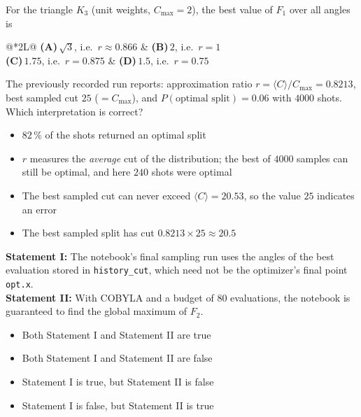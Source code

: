 \documentclass[11pt,a4paper]{article}
\newcommand{\optlabel}[1]{\textbf{(#1)}}
\newenvironment{qitem}[1]{\begin{list}{}{\setlength{\leftmargin}{3.3em}\setlength{\labelwidth}{3.1em}%
  \setlength{\labelsep}{0.2em}\setlength{\topsep}{3pt}\setlength{\parsep}{3pt}}\item[\textbf{Q.#1}\hfill]}{\end{list}}
\newcommand{\qsep}{\par\vspace{2pt}{\color{black!15}\hrule}\vspace{4pt}}
\begin{document}
\begin{qitem}{56}
For the triangle $K_3$ (unit weights, $C_{\max} = 2$), the best value of $F_1$ over all angles is
\par\smallskip\noindent\begin{tabularx}{\linewidth}{@{}*{2}{L}@{}}
\optlabel{A}\,$\sqrt3$, i.e.\ $r \approx 0.866$ & \optlabel{B}\,$2$, i.e.\ $r = 1$ \\[3pt]
\optlabel{C}\,$1.75$, i.e.\ $r = 0.875$ & \optlabel{D}\,$1.5$, i.e.\ $r = 0.75$
\end{tabularx}
\end{qitem}
\qsep

\begin{qitem}{57}
The previously recorded run reports: approximation ratio $r = \langle C\rangle/C_{\max} = 0.8213$, best sampled cut $25$
($= C_{\max}$), and $P(\text{optimal split}) = 0.06$ with $4000$ shots. Which interpretation is correct?
\begin{itemize}[leftmargin=2.6em, labelsep=0.4em, itemsep=2pt, topsep=3pt]
\item[\optlabel{A}] $82\,\%$ of the shots returned an optimal split
\item[\optlabel{B}] $r$ measures the \emph{average} cut of the distribution; the best of $4000$ samples can still be optimal, and here $240$ shots were optimal
\item[\optlabel{C}] The best sampled cut can never exceed $\langle C\rangle = 20.53$, so the value $25$ indicates an error
\item[\optlabel{D}] The best sampled split has cut $0.8213 \times 25 \approx 20.5$
\end{itemize}
\end{qitem}
\qsep

\begin{qitem}{58}
\textbf{Statement I:} The notebook's final sampling run uses the angles of the best evaluation stored in
\texttt{history\_cut}, which need not be the optimizer's final point \texttt{opt.x}.\\[1mm]
\textbf{Statement II:} With COBYLA and a budget of 80 evaluations, the notebook is guaranteed to find the global maximum of $F_2$.
\begin{itemize}[leftmargin=2.6em, labelsep=0.4em, itemsep=2pt, topsep=3pt]
\item[\optlabel{A}] Both Statement I and Statement II are true
\item[\optlabel{B}] Both Statement I and Statement II are false
\item[\optlabel{C}] Statement I is true, but Statement II is false
\item[\optlabel{D}] Statement I is false, but Statement II is true
\end{itemize}
\end{qitem}
\qsep
\end{document}
